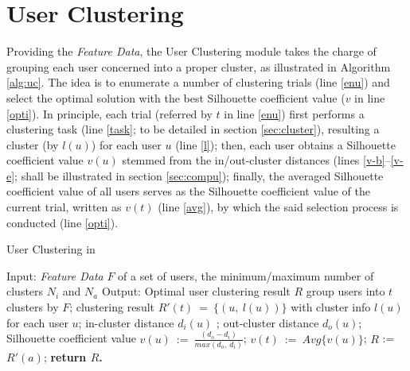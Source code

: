 \section{User Clustering}
\label{sec:uc}


Providing the \textit{Feature Data}, the User Clustering module takes the charge of grouping each user concerned into a proper cluster,
as illustrated in  Algorithm \ref{alg:uc}.
%
The idea is to enumerate a number of clustering trials (line \ref{enu}) and select the optimal solution with the best Silhouette coefficient value ($v$ in line \ref{opti}).
In principle, each trial (referred by $t$ in line \ref{enu}) first performs a clustering task (line \ref{task}; to be detailed in section \ref{sec:cluster}), resulting a cluster (by $l(u)$) for each user $u$ (line \ref{l});
then, each user obtains a Silhouette coefficient value $v(u)$ stemmed from the in/out-cluster distances (lines \ref{v-b}--\ref{v-e}; shall be illustrated in section \ref{sec:compu});
finally, the averaged Silhouette coefficient value of all users serves as the Silhouette coefficient value of the current trial, written as $v(t)$ (line \ref{avg}), by which the said selection process is conducted (line \ref{opti}).


\begin{algorithm}[t]
\begin{small}
\caption{User Clustering in \sys{}}
\label{alg:uc}
\begin{algorithmic}[1]
\State Input: \textit{Feature Data} $F$  of a set of users, the minimum/maximum number of clusters $N_i$ and $N_a$
\State Output: Optimal user clustering result $R$
\vspace{1ex}
 \label{enu}
	\State group users into $t$ clusters by $F$; \label{task}
	\State clustering result $R'(t)\ =\ \{(u,\ l(u))\}$ with cluster info $l(u)$ for each user $u$; \label{l}
		\State in-cluster distance $d_i(u)$ \label{v-b};
		\State out-cluster distance $d_o(u)$;
		\State Silhouette coefficient value $v(u)\ :=\ \frac{(d_o - d_i)}{max(d_o,\ d_i)}$; \label{v-e}
	\EndFor
	\State $v(t)\ :=\ Avg\{v(u)\}$; \label{avg}
\EndFor
{} \label{opti}
	\State $R$ := $R'(a)$;
\EndIf
\State \bfseries{return} $R$.
\end{algorithmic}
\end{small}
\end{algorithm}


